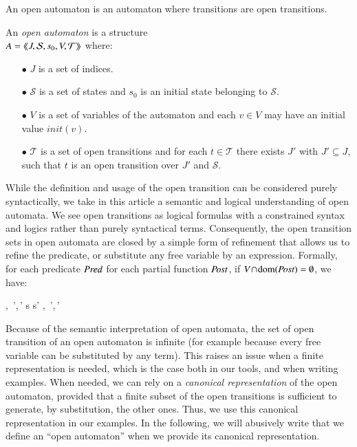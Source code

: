 \documentclass{elsarticle}
\makeatletter
\newcommand{\LUDO}[1]{\textcolor{darkgreen}{#1}}
\newcommand{\raisemath}[1]{\mathpalette{\raisem@th{#1}}}
\newcommand{\raisem@th}[3]{\raisebox{#1}{$#2#3$}}
\newcommand{\shortodot}{\!\odot\!}
\makeatother
\begin{document}
An open automaton is  an automaton where transitions are open transitions.
\begin{definition}
	\label{def:open-automaton}
	An \emph{open automaton} is a structure\\ $A =
	\langle\hspace{-0.45ex}\langle J,\mathcal{S},s_0,V,\mathcal{T}\rangle\hspace{-0.45ex}\rangle$ where:
	\begin{itemize}
		\item[$\bullet$]   $J$ is a  set of indices.
		\item[$\bullet$]   $\mathcal{S}$ is a set of states and $s_0$ is an initial state
		  belonging to $\mathcal{S}$.
 \item[$\bullet$] $V$ is a set of variables of the automaton
		and each $v\in V$ may have an initial value $init(v)$.
		\item[$\bullet$] $\mathcal{T}$ is a set of open transitions and for each
		$t\in \mathcal{T}$ there exists  $J'$ with  $J'
		\subseteq J$, such that $t$ is an open transition over  $J'$
		and  $\mathcal{S}$.
		
	\end{itemize}

While the definition and usage of the open transition can be considered purely syntactically, we take in this article a semantic and logical understanding of open automata. 
We  see open transitions as logical formulas with a constrained syntax and logics rather than purely syntactical terms.
Consequently, the open transition sets in open automata are closed by a simple form of refinement that allows us to refine the predicate, or substitute any free variable by
an expression. Formally, for each predicate $\Pred$ for each partial function $\Post$, if $V\!\cap \!\dom(\Post)=\emptyset$, we have: 
		 \begin{mathpar}
    \openrule
         {
           \set{\beta}, \Pred\,',\Post\,'}
          {s \OTarrow {\alpha} s'}\in{}
\quad\implies\quad
    \openrule
         {
           \set{\beta}\subst{\Post}, \Pred\,'\subst{\Post}\land\Pred,\Post\shortodot\Post\,'}
         {\raisemath{-2pt}{s \OTarrow {\alpha\subst{\Post}} {s'}}{}}
 \in{}
\end{mathpar}
\end{definition}

Because of the semantic interpretation of open automata, the set of open transition of an open automaton is infinite (for example because every free variable can be substituted by any term).
This raises an issue when a finite representation is needed, which is the case both in our tools, and when writing examples.
When needed, we can rely on a \emph{canonical representation} of the open automaton, provided that a  finite subset of the open transitions  is sufficient to generate, by substitution, the other ones. 
Thus, we use this canonical representation  in our examples.
In the following, we will abusively write that we define an ``open automaton'' when we provide its canonical representation.
\end{document}
